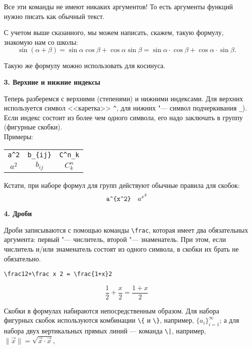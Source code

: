 \documentclass{article}
\begin{document}
Все эти команды не имеют никаких аргументов! То есть аргументы функций нужно писать как обычный текст.

С учетом выше сказанного, мы можем написать, скажем, такую формулу, знакомую нам со школы:
\[
\sin(\alpha+\beta)
=\sin\alpha \cos\beta+\cos\alpha \sin\beta = \sin\alpha \cdot \cos\beta+\cos\alpha \cdot \sin\beta.
\]

\noindent Такую же формулу можно использовать для косинуса.





\bigskip


\textbf{3. Верхние и нижние индексы}

Теперь разберемся с верхними (степенями) и нижними индексами. Для верхних используется символ <<каретка>> \verb"^", для нижних "--- символ подчеркивания \verb"_"). Если индекс состоит из более чем одного символа, его надо заключать в группу (фигурные скобки).\\
Примеры:

\begin{center}
\begin{tabular}{ccc}
\verb"a^2"  &  \verb"b_{ij}" & \verb"C^n_k" \\
     $a^2$  &       $b_{ij}$ &      $C^n_k$
\end{tabular}
\end{center}


\medskip
Кстати, при наборе формул для групп действуют обычные правила для скобок:
\[
\verb"a^{x^2}"  \quad  a^{x^2}
\]



\bigskip

\textbf{4. Дроби}

Дроби записываются с помощью команды \verb"\frac", которая имеет два обязательных  аргумента: первый "--- числитель, второй "--- знаменатель. При этом, если числитель и/или знаменатель состоят из одного символа, в скобки их брать не обязательно.

\begin{center}
\verb|\frac12+\frac x 2 = \frac{1+x}2| 
\end{center}
\[
 \frac12+\frac x 2 = \frac{1+x}2
\]


\newpage

Скобки в формулах набираются непосредственным образом. Для набора фигурных скобок используются комбинации \verb"\{" и \verb|\}|, например, $\{a_i\}_{i=1}^{\infty}$; а для набора двух вертикальных прямых линий --- команда \verb"\|", например, 
$
 \| \vec x \| = \sqrt{\vec x \cdot \vec x},
$
\end{document}
